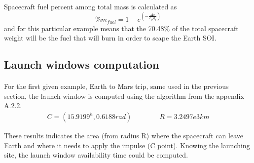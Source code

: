 	Spacecraft fuel percent among total mass is calculated as
	\begin{equation}
		\%m_{fuel} = 1-e^{(-\frac{\Delta v}{I_{sp}g_0})}
	\end{equation}
	and for this particular example means that the 70.48\% of the total spacecraft weight will be the fuel that will burn in order to scape the Earth SOI.
	\subsection{Launch windows computation}
\paragraph{}	For the first given example, Earth to Mars trip, same used in the previous section, the launch window is computed using the algorithm from the appendix A.2.2.
\begin{align*}
	C=(15.9199^h, 0.6188rad)  \qquad \qquad R=3.2497e3 km
\end{align*}

These results indicates the area (from radius R) where the spacecraft can leave Earth and where it needs to apply the impulse (C point). Knowing the launching site, the launch window availability time could be computed. 
	